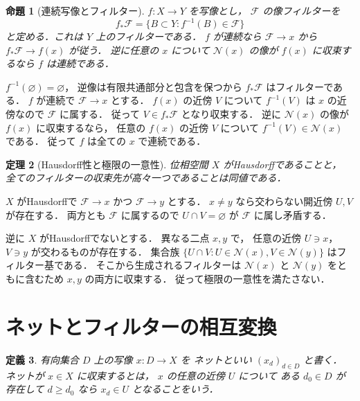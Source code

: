 \documentclass[a5paper,10pt,onecolumn]{jsarticle}
\makeatletter
\theoremstyle{mathnotetheorem}
\newtheorem{theorem}{定理}[section]
\newtheorem{definition}[theorem]{定義}
\newtheorem{proposition}[theorem]{命題}
\renewcommand{\proofname}{証明}
\renewenvironment{proof}[1][\proofname]{%
  \par\pushQED{\qed}\normalfont\topsep4\p@\@plus2\p@\relax
  \trivlist\item[\hskip\labelsep\bfseries #1]\ignorespaces
}{\popQED\endtrivlist\@endpefalse}
\makeatother
\begin{document}
\begin{proposition}[連続写像とフィルター]\label{prop:continuous}
$f:X\to Y$ を写像とし，
$\mathcal F$ の\emph{像フィルター}を
\[
 f_*\mathcal F
 =\{B\subset Y:f^{-1}(B)\in\mathcal F\}
\]
と定める．これは $Y$ 上のフィルターである．
$f$ が連続なら
$\mathcal F\to x$ から
$f_*\mathcal F\to f(x)$ が従う．
逆に任意の $x$ について
$\mathcal N(x)$ の像が $f(x)$ に収束するなら
$f$ は連続である．
\end{proposition}
\begin{proof}
$f^{-1}(\varnothing)=\varnothing$，
逆像は有限共通部分と包含を保つから
$f_*\mathcal F$ はフィルターである．
$f$ が連続で $\mathcal F\to x$ とする．
$f(x)$ の近傍 $V$ について $f^{-1}(V)$ は
$x$ の近傍なので $\mathcal F$ に属する．
従って $V\in f_*\mathcal F$ となり収束する．
逆に $\mathcal N(x)$ の像が $f(x)$ に収束するなら，
任意の $f(x)$ の近傍 $V$ について
$f^{-1}(V)\in\mathcal N(x)$ である．
従って $f$ は全ての $x$ で連続である．
\end{proof}

\begin{theorem}[Hausdorff性と極限の一意性]\label{thm:hausdorff}
位相空間 $X$ がHausdorffであることと，
全てのフィルターの収束先が高々一つであることは同値である．
\end{theorem}
\begin{proof}
$X$ がHausdorffで
$\mathcal F\to x$ かつ $\mathcal F\to y$ とする．
$x\ne y$ なら交わらない開近傍 $U,V$ が存在する．
両方とも $\mathcal F$ に属するので
$U\cap V=\varnothing$ が $\mathcal F$ に属し矛盾する．

逆に $X$ がHausdorffでないとする．
異なる二点 $x,y$ で，
任意の近傍 $U\ni x$，$V\ni y$ が交わるものが存在する．
集合族
$\{U\cap V:U\in\mathcal N(x),V\in\mathcal N(y)\}$
はフィルター基である．
そこから生成されるフィルターは
$\mathcal N(x)$ と $\mathcal N(y)$ をともに含むため
$x,y$ の両方に収束する．
従って極限の一意性を満たさない．
\end{proof}

\section{ネットとフィルターの相互変換}

\begin{definition}
有向集合 $D$ 上の写像 $x:D\to X$ を
\emph{ネット}といい $(x_d)_{d\in D}$ と書く．
ネットが $x\in X$ に収束するとは，
$x$ の任意の近傍 $U$ について
ある $d_0\in D$ が存在して
$d\ge d_0$ なら $x_d\in U$ となることをいう．
\end{definition}
\end{document}
